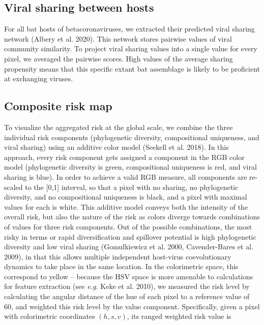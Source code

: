 \documentclass[11pt]{article}
\begin{document}
\hypertarget{viral-sharing-between-hosts}{%
\subsection{Viral sharing between
hosts}\label{viral-sharing-between-hosts}}

For all bat hosts of betacoronaviruses, we extracted their predicted
viral sharing network (Albery et al. 2020). This network stores pairwise
values of viral community similarity. To project viral sharing values
into a single value for every pixel, we averaged the pairwise scores.
High values of the average sharing propensity means that this specific
extant bat assemblage is likely to be proficient at exchanging viruses.

\hypertarget{composite-risk-map}{%
\subsection{Composite risk map}\label{composite-risk-map}}

To visualize the aggregated risk at the global scale, we combine the
three individual risk components (phylogenetic diversity, compositional
uniqueness, and viral sharing) using an additive color model (Seekell et
al. 2018). In this approach, every risk component gets assigned a
component in the RGB color model (phylogenetic diversity is green,
compositional uniqueness is red, and viral sharing is blue). In order to
achieve a valid RGB measure, all components are re-scaled to the
{[}0,1{]} interval, so that a pixel with no sharing, no phylogenetic
diversity, and no compositional uniqueness is black, and a pixel with
maximal values for each is white. This additive model conveys both the
intensity of the overall risk, but also the nature of the risk as colors
diverge towards combinations of values for three risk components. Out of
the possible combinations, the most risky in terms or rapid
diversification and spillover potential is high phylogenetic diversity
and low viral sharing (Gomulkiewicz et al. 2000, Cavender-Bares et al.
2009), in that this allows multiple independent host-virus
coevolutionary dynamics to take place in the same location. In the
colorimetric space, this correspond to yellow -- because the HSV space
is more amenable to calculations for feature extraction (see \emph{e.g.}
Keke et al. 2010), we measured the risk level by calculating the angular
distance of the hue of each pixel to a reference value of 60, and
weighted this risk level by the value component. Specifically, given a
pixel with colorimetric coordinates \((h,s,v)\), its ranged weighted
risk value is
\end{document}
